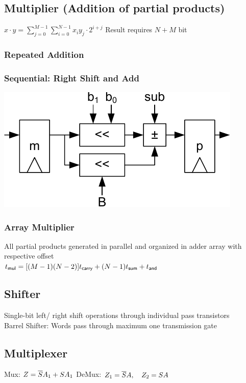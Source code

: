 \begin{sectionbox}
    \subsection{Multiplier (Addition of partial products)}
    $x \cdot y = \sum\limits_{j = 0}^{M-1} \sum\limits_{i = 0}^{N-1} x_i y_j \cdot 2^{i+j}$ \quad Result requires $N+M$ bit
    \subsubsection{Repeated Addition}
    
    \subsubsection{Sequential: Right Shift and Add}
    \begin{center}
		\includegraphics[width = 0.6\columnwidth]{./img/booth_multiplier.pdf}
	\end{center}
    
    \subsubsection{Array Multiplier}
	All partial products generated in
parallel and organized in adder
array with respective offset\\
	$t_{\sf mul} = [(M-1)(N-2)] t_{\sf carry} + (N-1) t_{\sf sum} + t_{\sf and}$
\end{sectionbox}


\begin{sectionbox}
    \subsection{Shifter}
    Single-bit left/ right shift operations through individual pass transistors\\
    Barrel Shifter: Words pass through maximum one transmission gate\\

\end{sectionbox}
\begin{sectionbox}
    \subsection{Multiplexer}
	Mux: $Z = \overline{S} A_1 + S A_1$ \qquad \quad DeMux: $Z_1 = \overline{S} A, \quad Z_2 = SA$ 
\end{sectionbox} 


